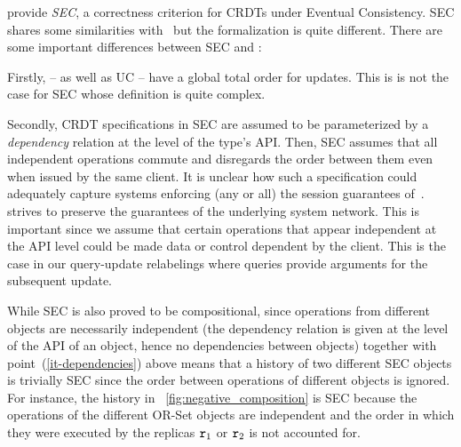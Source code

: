 
\citet{JagadeesanR18} provide \emph{SEC}, a correctness criterion for CRDTs under
Eventual Consistency.
%
SEC shares some similarities with~\cite{PerrinMJ14} but the
formalization is quite different.
There are some important differences between SEC and \CRDTLinshort{}:
\begin{inparaenum}
\item Firstly, \CRDTLinshort{} -- as well as UC --
  have a global total order for updates. This is is not the case for
  SEC whose definition is quite complex.
\item
  \label{it-dependencies} Secondly, CRDT specifications in SEC are
  assumed to be parameterized by a \emph{dependency} relation at the
  level of the type's API.
  Then, SEC assumes that all independent operations commute and
  disregards the order between them even when issued by the same client.
  It is unclear how such a specification could adequately capture
  systems enforcing (any or all) the session guarantees
  of~\cite{TerryDPSTW94}.
  \CRDTLinshort{} strives to preserve the guarantees of the
  underlying system network.
  This is important since we assume that certain
  operations that appear independent at the API level could be
  made data or control dependent by the client.
  This is the case in our query-update relabelings where queries
  provide arguments for the subsequent update.
\item While SEC is also proved to be compositional, since operations
  from different objects are necessarily independent (the dependency
  relation is given at the level of the API of an object, hence no
  dependencies between objects) together with
  point~(\ref{it-dependencies}) above means that a history of two
  different SEC objects is trivially SEC since the order between
  operations of different objects is ignored.
  For instance, the
  history in \figureautorefname~\ref{fig:negative_composition} is SEC because
  the operations of the different OR-Set objects are independent and the
  order in which they were executed by the replicas $\mathtt{r}_1$ or $\mathtt{r}_2$
  is not accounted for.

\end{inparaenum}
